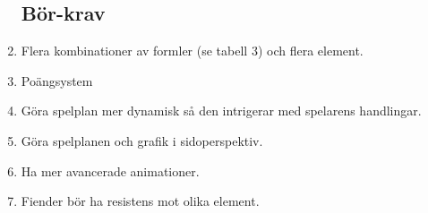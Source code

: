 \documentclass[12pt]{TDP005mall}
\begin{document}
\begin{enumerate}
\clearpage

\subsection{Bör-krav}
\item Flera kombinationer av formler (se tabell 3) och flera element.
\item Poängsystem
\item Göra spelplan mer dynamisk så den intrigerar med spelarens handlingar.
\item Göra spelplanen och grafik i sidoperspektiv. 
\item Ha mer avancerade animationer.
\item Fiender bör ha resistens mot olika element.
\end{enumerate}
\end{document}
